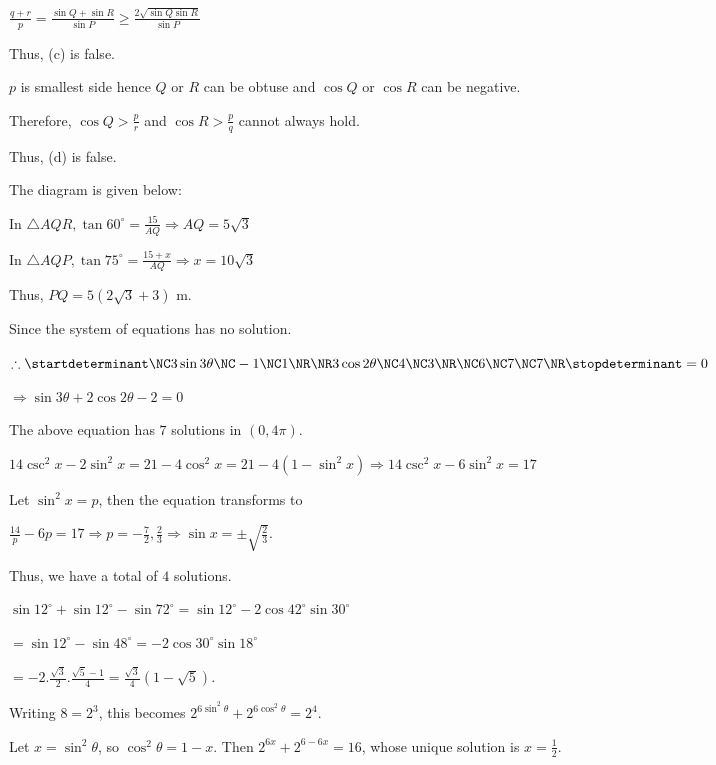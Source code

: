   $\frac{q + r}{p} = \frac{\sin Q + \sin R}{\sin P}\ge \frac{2\sqrt{\sin Q\sin R}}{\sin P}$

  Thus, (c) is false.

  $p$ is smallest side hence $Q$ or $R$ can be obtuse and $\cos Q$ or $\cos R$ can be negative.

  Therefore, $\cos Q > \frac{p}{r}$ and $\cos R > \frac{p}{q}$ cannot always hold.

  Thus, (d) is false.
\item The diagram is given below:

  \startplacefigure
    \externalfigure[17_25.pdf]
  \stopplacefigure

  In $\triangle AQR, \tan60^\circ = \frac{15}{AQ}\Rightarrow AQ = 5\sqrt{3}$

  In $\triangle AQP, \tan75^\circ = \frac{15 + x}{AQ} \Rightarrow x = 10\sqrt{3}$

  Thus, $PQ = 5\left(2\sqrt{3} + 3\right)$ m.
\item Since the system of equations has no solution.

  $\therefore \startdeterminant\NC3\sin3\theta\NC -1\NC 1\NR\NR 3\cos2\theta \NC 4\NC 3\NR\NC 6\NC 7\NC
  7\NR\stopdeterminant = 0$

  $\Rightarrow \sin3\theta + 2\cos2\theta - 2 = 0$

  The above equation has $7$ solutions in $(0, 4\pi)$.
\item $14\csc^2x - 2\sin^2x = 21 - 4\cos^2x  = 21 - 4(1 - \sin^2x)\Rightarrow 14\csc^2x - 6\sin^2x = 17$

  Let $\sin^2x = p$, then the equation transforms to

  $\frac{14}{p} - 6p = 17 \Rightarrow p = -\frac{7}{2}, \frac{2}{3}\Rightarrow \sin x
  = \pm\sqrt{\frac{2}{3}}$.

  Thus, we have a total of $4$ solutions.
\item $\sin12^\circ + \sin12^\circ - \sin72^\circ = \sin12^\circ - 2\cos42^\circ\sin30^\circ$

  $= \sin12^\circ - \sin48^\circ = -2\cos30^\circ\sin18^\circ$

  $= -2.\frac{\sqrt{3}}{2}.\frac{\sqrt{5} - 1}{4} = \frac{\sqrt{3}}{4}\left(1 - \sqrt{5}\right)$.
\item Writing $8=2^3$, this becomes $2^{6\sin^2\theta}+2^{6\cos^2\theta}=2^4$.

  Let $x=\sin^2\theta$, so $\cos^2\theta=1-x$. Then $2^{6x}+2^{6-6x}=16$,
  whose unique solution is $x=\tfrac12$.

